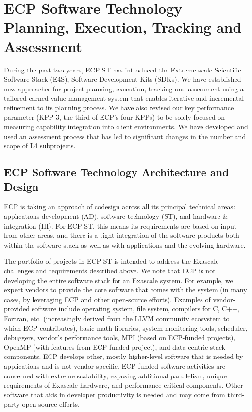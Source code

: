 \section{ECP Software Technology Planning, Execution, Tracking and Assessment}\label{sect:PETA}
During the past two years, ECP ST has introduced the Extreme-scale Scientific Software Stack (E4S), Software Development Kits (SDKs).  We have established new approaches for project planning, execution, tracking and assessment using a tailored earned value management system that enables iterative and incremental refinement to its planning process.  We have also revised our key performance parameter (KPP-3, the third of ECP's four KPPs) to be solely focused on measuring capability integration into client environments.  We have developed and used an assessment process that has led to significant changes in the number and scope of L4 subprojects.

\subsection{ECP Software Technology Architecture and Design}
ECP is taking an approach of codesign across all its principal technical areas: applications development (AD), software technology (ST), and hardware \& integration (HI). For ECP ST, this means its requirements are based on input from other areas, and there is a tight integration of the software products both within the software stack as well as with applications and the evolving hardware. 

The portfolio of projects in ECP ST is intended to address the Exascale challenges and requirements described above. We note that ECP is not developing the entire software stack for an Exascale system. For example, we expect vendors to provide the core software that comes with the system (in many cases, by leveraging ECP and other open-source efforts). Examples of vendor-provided software include operating system, file system, compilers for C, C++, Fortran, etc. (increasingly derived from the LLVM community ecosystem to which ECP contributes), basic math libraries, system monitoring tools, scheduler, debuggers, vendor’s performance tools, MPI (based on ECP-funded projects), OpenMP (with features from ECP-funded project), and data-centric stack components. ECP develops other, mostly higher-level software that is needed by applications and is not vendor specific. ECP-funded software activities are concerned with extreme scalability, exposing additional parallelism, unique requirements of Exascale hardware, and performance-critical components. Other software that aids in developer productivity is needed and may come from third-party open-source efforts.

